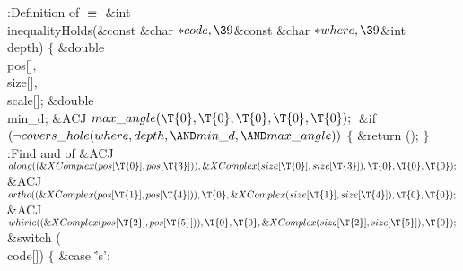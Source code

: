 \Y\B\4:Definition of \X${}\equiv{}$\6
\&{int} \\{inequalityHolds}(\&{const} \&{char} ${}{*}\\{code},\39{}$\&{const} %
\&{char} ${}{*}\\{where},\39{}$\&{int} \\{depth})\1\1\2\2\6
${}\{{}$\1\6
\&{double} \\{pos}[]${},{}$ \\{size}[]${},{}$ \\{scale}[];\6
\&{double} \\{min\_d};\6
\&{ACJ} ${}\\{max\_angle}(\T{0},\39\T{0},\39\T{0},\39\T{0},\39\T{0});{}$\7
\&{if} ${}(\R\\{covers\_hole}(\\{where},\39\\{depth},\39{\AND}\\{min\_d},\39{%
\AND}\\{max\_angle})){}$\5
${}\{{}$\1\6
\&{return} ();\6
\4${}\}{}$\2\6
:Find  and  of \X\7
\&{ACJ} ${}\\{along}((\&{XComplex}(\\{pos}[\T{0}],\39\\{pos}[\T{3}])),\39%
\&{XComplex}(\\{size}[\T{0}],\39\\{size}[\T{3}]),\39\T{0},\39\T{0},\39%
\T{0});{}$\6
\&{ACJ} ${}\\{ortho}((\&{XComplex}(\\{pos}[\T{1}],\39\\{pos}[\T{4}])),\39\T{0},%
\39\&{XComplex}(\\{size}[\T{1}],\39\\{size}[\T{4}]),\39\T{0},\39\T{0});{}$\6
\&{ACJ} ${}\\{whirle}((\&{XComplex}(\\{pos}[\T{2}],\39\\{pos}[\T{5}])),\39%
\T{0},\39\T{0},\39\&{XComplex}(\\{size}[\T{2}],\39\\{size}[\T{5}]),\39%
\T{0});{}$\7
\&{switch} (\\{code}[])\5
${}\{{}$\1\6
\4\&{case} \.{'s'}:\6
